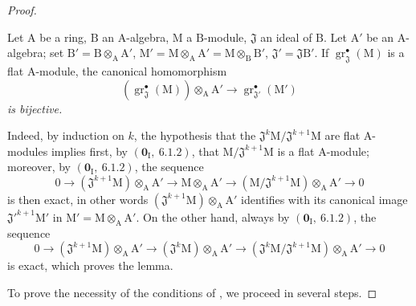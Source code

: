 \begin{proof}
\begin{lemma}[11.2.9.2]
\label{IV.11.2.9.2}
Let $\mathrm{A}$ be a ring, $\mathrm{B}$ an $\mathrm{A}$-algebra, $\mathrm{M}$ a $\mathrm{B}$-module, $\mathfrak{J}$ an ideal of $\mathrm{B}$. Let $\mathrm{A}'$ be an $\mathrm{A}$-algebra; set $\mathrm{B}'=\mathrm{B}\otimes_\mathrm{A}\mathrm{A}'$, $\mathrm{M}'=\mathrm{M}\otimes_\mathrm{A}\mathrm{A}'=\mathrm{M}\otimes_\mathrm{B}\mathrm{B}'$, $\mathfrak{J}'=\mathfrak{J}\mathrm{B}'$. If $\operatorname{gr}^\bullet_\mathfrak{J}(\mathrm{M})$ is a flat $\mathrm{A}$-module, the canonical homomorphism
\[
  (\operatorname{gr}^\bullet_\mathfrak{J}(\mathrm{M}))\otimes_\mathrm{A}\mathrm{A}'\to\operatorname{gr}^\bullet_{\mathfrak{J}'}(\mathrm{M}')
\]
\emph{is bijective.}
\end{lemma}


Indeed, by induction on $k$, the hypothesis that the $\mathfrak{J}^k\mathrm{M}/\mathfrak{J}^{k+1}\mathrm{M}$ are flat A-modules implies first, by $(\mathbf{0}_\mathrm{I},~6.1.2)$, that $\mathrm{M}/\mathfrak{J}^{k+1}\mathrm{M}$ is a flat A-module; moreover, by $(\mathbf{0}_\mathrm{I},~6.1.2)$, the sequence
\[
  0\to(\mathfrak{J}^{k+1}\mathrm{M})\otimes_\mathrm{A}\mathrm{A}'\to\mathrm{M}\otimes_\mathrm{A}\mathrm{A}'\to(\mathrm{M}/\mathfrak{J}^{k+1}\mathrm{M})\otimes_\mathrm{A}\mathrm{A}'\to 0
\]
is then exact, in other words $(\mathfrak{J}^{k+1}\mathrm{M})\otimes_\mathrm{A}\mathrm{A}'$ identifies with its canonical image $\mathfrak{J}'^{k+1}\mathrm{M}'$ in $\mathrm{M}'=\mathrm{M}\otimes_\mathrm{A}\mathrm{A}'$. On the other hand, always by $(\mathbf{0}_\mathrm{I},~6.1.2)$, the sequence
\[
  0\to(\mathfrak{J}^{k+1}\mathrm{M})\otimes_\mathrm{A}\mathrm{A}'\to(\mathfrak{J}^k\mathrm{M})\otimes_\mathrm{A}\mathrm{A}'\to(\mathfrak{J}^k\mathrm{M}/\mathfrak{J}^{k+1}\mathrm{M})\otimes_\mathrm{A}\mathrm{A}'\to 0
\]
is exact, which proves the lemma.

To prove the necessity of the conditions of , we proceed in several steps.


\end{proof}
